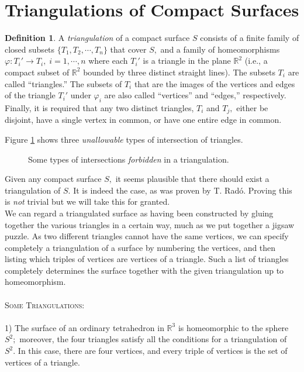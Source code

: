 \documentclass{article}
\theoremstyle{definition}
\newtheorem{defn}[theorem]{Definition}
\begin{document}
\section{Triangulations of Compact Surfaces}\label{sec:triangulations}
%
\begin{defn}
  A \emph{triangulation} of a compact surface $S$ consists of a finite family of closed subsets $\{T_1, T_2, \cdots, T_n\}$ that cover $S,$ and a family of homeomorphisms $\varphi : T_i'\longrightarrow T_i,\; i = 1, \cdots, n$ where each $T_i'$ is a triangle in the plane $\mathbb{R}^2$ (i.e., a compact subset of $\mathbb{R}^2$ bounded by three distinct straight lines). The subsets $T_i$ are called ``triangles.'' The subsets of $T_i$ that are the images of the vertices and edges of the triangle $T_i'$ under $\varphi_i$ are also called ``vertices'' and ``edges,'' respectively. Finally, it is required that any two distinct triangles, $T_i$ and $T_j,$ either be disjoint, have a single vertex in common, or have one entire edge in common.
\end{defn}
Figure \ref{fig:triang unallowed} shows three \emph{unallowable} types of intersection of triangles.
\begin{figure}[htb]
  \centering
  
  \caption{Some types of intersections \emph{forbidden} in a triangulation.}
  \label{fig:triang unallowed}
\end{figure}
Given any compact surface $S,$ it seems plausible that there should exist a triangulation of $S.$ It is indeed the case, as was proven by T. Radó. Proving this is \emph{not} trivial but we will take this for granted.\\
We can regard a triangulated surface as having been constructed by gluing together the various triangles in a certain way, much as we put together a jigsaw puzzle. As two different triangles cannot have the same vertices, we can specify completely a triangulation of a surface by numbering the vertices, and then listing which triples of vertices are vertices of a triangle. Such a list of triangles completely determines the surface together with the given triangulation up to homeomorphism.\\~\\
\textsc{Some Triangulations:}\\\\
1) The surface of an ordinary tetrahedron in $\mathbb{R}^3$ is homeomorphic to the sphere $S^2;$ moreover, the four triangles satisfy all the conditions for a triangulation of $S^2.$ In this case, there are four vertices, and every triple of vertices is the set of vertices of a triangle.\\\\
\end{document}
